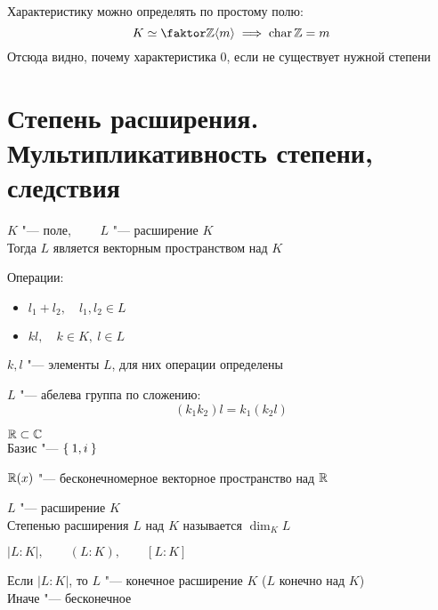 \begin{remark}
	Характеристику можно определять по простому полю:
	$$ K \simeq \faktor\Z{\braket m} \implies \chara \Z = m $$
	Отсюда видно, почему характеристика 0, если не существует нужной степени
\end{remark}

\section{Степень расширения. Мультипликативность степени, следствия}

\begin{lemma}
	$ K $ "--- поле, $ \qquad L $ "--- расширение $ K $ \\
	Тогда $ L $ является векторным пространством над $ K $
\end{lemma}

\begin{iproof}
	\item Операции:
	\begin{itemize}
		\item $ l_1 + l_2, \quad l_1, l_2 \in L $
		\item $ kl, \quad k \in K, ~ l \in L $
	\end{itemize}
	$ k, l $ "--- элементы $ L $, для них операции определены
	\item $ L $ "--- абелева группа по сложению:
	$$ (k_1k_2)l = k_1(k_2l) $$
\end{iproof}

\begin{exmpls}
	\item $ \mathbb{R} \subset \mathbb{C} $ \\
	Базис "--- $ \Set{1, i} $
	\item $ \mathbb{R}(x) $ "--- бесконечномерное векторное пространство над $ \mathbb{R} $
\end{exmpls}

\begin{definition}
	$ L $ "--- расширение $ K $ \\
	Степенью расширения $ L $ над $ K $ называется $ \dim_K L $
\end{definition}

\begin{notation}
	$ |L : K|, \qquad (L : K), \qquad [L : K] $
\end{notation}

Если $ |L : K| $, то $ L $ "--- конечное расширение $ K $ ($ L $ конечно над $ K $) \\
Иначе "--- бесконечное

